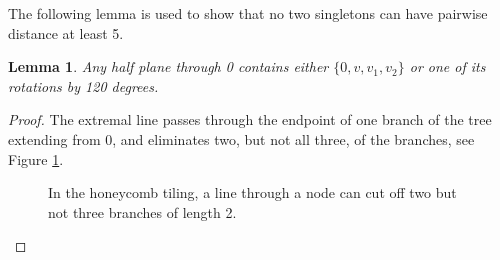 \documentclass[a4paper, 12pt, notitlepage]{amsart}
\newtheorem{lemma}[theorem]{Lemma}
\theoremstyle{remark}
\begin{document}
The following lemma is used to show that no two singletons can have pairwise distance at least 5.
\begin{lemma}\label{separating_line_lemma}
 Any half plane through 0 contains either $\{0, v, v_1, v_2\}$ or one of its rotations by 120 degrees.
\end{lemma}
\begin{proof}
 The extremal line passes through the endpoint of one branch of the tree extending from 0, and eliminates two, but not all three, of the branches, see Figure \ref{fig:branch_length_2}.
 
 \begin{figure}
\caption{In the honeycomb tiling, a line through a node can cut off two but not three branches of length 2.}\label{fig:branch_length_2}
 \end{figure}
\end{proof}
\end{document}
